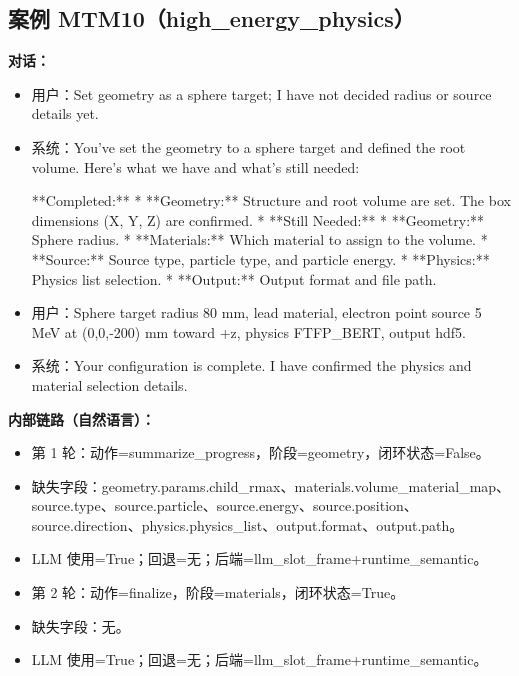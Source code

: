 \documentclass[11pt]{ctexart}
\begin{document}
\subsection{案例 MTM10（high\_energy\_physics）}
\textbf{对话：}
\begin{itemize}
\item 用户：Set geometry as a sphere target; I have not decided radius or source details yet.
\item 系统：You've set the geometry to a sphere target and defined the root volume. Here's what we have and what's still needed:

**Completed:**
*   **Geometry:** Structure and root volume are set. The box dimensions (X, Y, Z) are confirmed.
*   **Still Needed:**
    *   **Geometry:** Sphere radius.
    *   **Materials:** Which material to assign to the volume.
    *   **Source:** Source type, particle type, and particle energy.
    *   **Physics:** Physics list selection.
    *   **Output:** Output format and file path.
\item 用户：Sphere target radius 80 mm, lead material, electron point source 5 MeV at (0,0,-200) mm toward +z, physics FTFP\_BERT, output hdf5.
\item 系统：Your configuration is complete. I have confirmed the physics and material selection details.
\end{itemize}
\textbf{内部链路（自然语言）：}
\begin{itemize}
\item 第 1 轮：动作=summarize\_progress，阶段=geometry，闭环状态=False。
\item 缺失字段：geometry.params.child\_rmax、materials.volume\_material\_map、source.type、source.particle、source.energy、source.position、source.direction、physics.physics\_list、output.format、output.path。
\item LLM 使用=True；回退=无；后端=llm\_slot\_frame+runtime\_semantic。
\item 第 2 轮：动作=finalize，阶段=materials，闭环状态=True。
\item 缺失字段：无。
\item LLM 使用=True；回退=无；后端=llm\_slot\_frame+runtime\_semantic。
\end{itemize}
\end{document}
